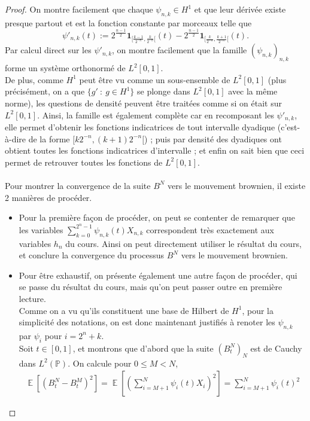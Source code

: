 \documentclass{article}
\theoremstyle{definition}
\numberwithin{equation}{section}
\DeclareMathOperator{\E}{\mathbb{E}}
\begin{document}
\begin{proof}
On montre facilement que chaque $\psi_{n,k}\in H^1$ et que leur dérivée existe presque partout et est la fonction constante par morceaux telle que
$$ \psi'_{n,k}(t) := 2^{\frac{n-1}{2}}\mathbf{1}_{[\frac{k-1}{2^{-n}},\frac{k}{2^{-n}}[}(t) - 2^{\frac{n-1}{2}}\mathbf{1}_{[\frac{k}{2^{-n}},\frac{k+1}{2^{-n}}[}(t) .$$
Par calcul direct sur les $\psi'_{n,k}$, on montre facilement que la famille $(\psi_{n,k})_{n,k}$ forme un système orthonormé de $L^2[0,1]$.\\
De plus, comme $H^1$ peut être vu comme un sous-ensemble de $L^2[0,1]$ (plus précisément, on a que $\{g'~:~g\in H^1\}$ se plonge dans $L^2[0,1]$ avec la même norme), les questions de densité peuvent être traitées comme si on était sur $L^2[0,1]$. Ainsi, la famille est également complète car en recomposant les $\psi'_{n,k}$, elle permet d'obtenir les fonctions indicatrices de tout intervalle dyadique (c'est-à-dire de la forme $[k2^{-n},(k+1)2^{-n}[$) ; puis par densité des dyadiques ont obtient toutes les fonctions indicatrices d'intervalle ; et enfin on sait bien que ceci permet de retrouver toutes les fonctions de $L^2[0,1]$.\\
~\\
Pour montrer la convergence de la suite $B^N$ vers le mouvement brownien, il existe 2 manières de procéder.
\begin{itemize}
    \item[$\bullet$] Pour la première façon de procéder, on peut se contenter de remarquer que les variables $\sum_{k=0}^{2^n-1} \psi_{n,k}(t)X_{n,k}$ correspondent très exactement aux variables $h_n$ du cours. Ainsi on peut directement utiliser le résultat du cours, et conclure la convergence du processus $B^N$ vers le mouvement brownien.
    \item[$\bullet$] Pour être exhaustif, on présente également une autre façon de procéder, qui se passe du résultat du cours, mais qu'on peut passer outre en première lecture.\\
    Comme on a vu qu'ils constituent une base de Hilbert de $H^1$, pour la simplicité des notations, on est donc maintenant justifiés à renoter les $\psi_{n,k}$ par $\psi_i$ pour $i=2^n+k$.\\
    Soit $t\in[0,1]$, et montrons que d'abord que la suite $(B_t^N)_N$ est de Cauchy dans $L^2(\mathbb{P})$. On calcule pour $0\leq M<N$,
    \begin{align*}
        \E[(B_t^N-B_t^M)^2] = \E\left[ \left(\sum_{i=M+1}^N \psi_i(t) X_i\right)^2 \right] = \sum_{i=M+1}^N \psi_i(t)^2

\end{align*}
\end{itemize}
\end{proof}
\end{document}
